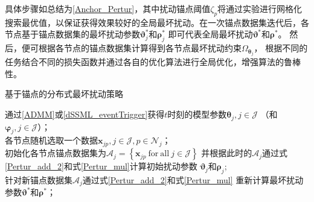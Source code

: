 具体步骤如总结为\autoref{Anchor_Pertur}，其中扰动锚点阈值$\zeta_p$将通过实验进行网格化搜索最优值，以保证获得效果较好的全局最坏扰动。在一次锚点数据集迭代后，各节点基于锚点数据集的最坏扰动参数$\boldsymbol \vartheta_j^* $和$\boldsymbol \rho_j^*$
即可代表全局最坏扰动$\boldsymbol \vartheta^*$和$\boldsymbol \rho^*$。
然后，便可根据各节点的锚点数据集计算得到各节点最坏扰动约束$\Omega_{\boldsymbol\theta_j}$，
根据不同的任务结合不同的损失函数并通过各自的优化算法进行全局优化，增强算法的鲁棒性。

\newpage
\begin{algorithm}[htbp]
	\caption{基于锚点的分布式最坏扰动策略}
	\label{Anchor_Pertur}
	\LinesNumbered
	
	通过\autoref{ADMM}或\autoref{dSSML_eventTrigger}获得$t$时刻的模型参数$\boldsymbol \theta_j,j\in\mathcal{J}$
    （和$\boldsymbol \varphi_j,j\in\mathcal{J}$）；\\
    各节点随机选取一个数据$\boldsymbol x_{jp}, j\in\mathcal{J}, p\in\mathcal{N}_j$；\\
    初始化各节点锚点数据集为$\mathcal{A}_j=\left\{\boldsymbol x_{jp}~\mathrm{for~all}~j \in \mathcal{J}\right\}$
    并根据此时的$\mathcal{A}_j$通过式\eqref{Pertur_add_2}和式\eqref{Pertur_mul}计算初始扰动参数
    $\boldsymbol \vartheta_j$和$\boldsymbol \rho_j$;\\
    针对新锚点数据集$\mathcal{A}_j$通过式\eqref{Pertur_add_2}和式\eqref{Pertur_mul}
    重新计算最坏扰动参数$\boldsymbol \vartheta^* $和$\boldsymbol \rho^*$；\\
\end{algorithm}
\newpage

